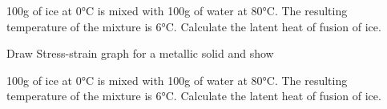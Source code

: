 \documentclass[10pt, a4paper, twoside]{exam}
\begin{document}
\begin{multicols*}{2}
\begin{questions}
        \question 100g of ice at 0°C is mixed with 100g of water at 80°C. The resulting temperature of the mixture is 6°C. Calculate the latent heat of fusion of ice.
        
        \question Draw Stress-strain graph for a metallic solid and show
    
    
        \question 100g of ice at 0°C is mixed with 100g of water at 80°C. The resulting temperature of the mixture is 6°C. Calculate the latent heat of fusion of ice.
        
    \end{questions}

\end{multicols*}
\end{document}
